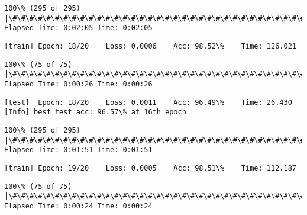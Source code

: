 \documentclass[11pt]{article}
\begin{document}
    \begin{Verbatim}[commandchars=\\\{\}]
100\% (295 of 295) |\#\#\#\#\#\#\#\#\#\#\#\#\#\#\#\#\#\#\#\#\#\#\#\#\#\#\#\#\#\#\#\#\#\#\#\#\#\#\#\#\#\#\#\#\#\#\#\#\#\#\#\#\#\#\#\#\#\#\#\#\#\#\#| Elapsed Time: 0:02:05 Time: 0:02:05

    \end{Verbatim}

    \begin{Verbatim}[commandchars=\\\{\}]
[train]	Epoch: 18/20	Loss: 0.0006	Acc: 98.52\%	Time: 126.021

    \end{Verbatim}

    \begin{Verbatim}[commandchars=\\\{\}]
100\% (75 of 75) |\#\#\#\#\#\#\#\#\#\#\#\#\#\#\#\#\#\#\#\#\#\#\#\#\#\#\#\#\#\#\#\#\#\#\#\#\#\#\#\#\#\#\#\#\#\#\#\#\#\#\#\#\#\#\#\#\#\#\#\#\#\#\#\#\#| Elapsed Time: 0:00:26 Time: 0:00:26

    \end{Verbatim}

    \begin{Verbatim}[commandchars=\\\{\}]
[test]	Epoch: 18/20	Loss: 0.0011	Acc: 96.49\%	Time: 26.430
[Info] best test acc: 96.57\% at 16th epoch

    \end{Verbatim}

    \begin{Verbatim}[commandchars=\\\{\}]
100\% (295 of 295) |\#\#\#\#\#\#\#\#\#\#\#\#\#\#\#\#\#\#\#\#\#\#\#\#\#\#\#\#\#\#\#\#\#\#\#\#\#\#\#\#\#\#\#\#\#\#\#\#\#\#\#\#\#\#\#\#\#\#\#\#\#\#\#| Elapsed Time: 0:01:51 Time: 0:01:51

    \end{Verbatim}

    \begin{Verbatim}[commandchars=\\\{\}]
[train]	Epoch: 19/20	Loss: 0.0005	Acc: 98.51\%	Time: 112.187

    \end{Verbatim}

    \begin{Verbatim}[commandchars=\\\{\}]
100\% (75 of 75) |\#\#\#\#\#\#\#\#\#\#\#\#\#\#\#\#\#\#\#\#\#\#\#\#\#\#\#\#\#\#\#\#\#\#\#\#\#\#\#\#\#\#\#\#\#\#\#\#\#\#\#\#\#\#\#\#\#\#\#\#\#\#\#\#\#| Elapsed Time: 0:00:24 Time: 0:00:24

    \end{Verbatim}
\end{document}
